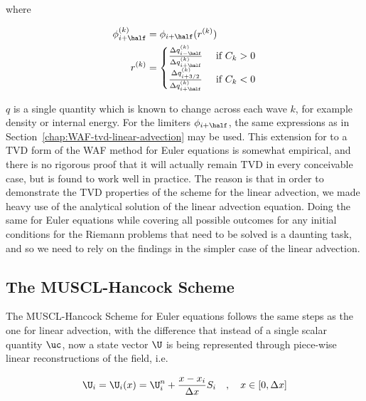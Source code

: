 where

\begin{align}
    \phi_{i+\half} ^{(k)} &= \phi_{i+\half}(r^{(k)}) \\
    r^{(k)} &= \begin{cases}
                \frac{\Delta q_{i-\half}^{(k)}}{\Delta q_{i+\half}^{(k)}} & \text{ if } C_k > 0 \\
                \frac{\Delta q_{i+3/2}^{(k)}}{\Delta q_{i+\half}^{(k)}} & \text{ if } C_k < 0
               \end{cases}
\end{align}

$q$ is a single quantity which is known to change across each wave $k$, for example density or
internal energy. For the limiters $\phi_{i+\half}$, the same expressions as in
Section~\ref{chap:WAF-tvd-linear-advection} may be used.
This extension for to a TVD form of the WAF method for Euler equations is somewhat empirical, and
there is no rigorous proof that it will actually remain TVD in every conceivable case, but is found
to work well in practice. The reason is that in order to demonstrate the TVD properties of the
scheme for the linear advection, we made heavy use of the analytical solution of the linear
advection equation. Doing the same for Euler equations while covering all possible outcomes for any
initial conditions for the Riemann problems that need to be solved is a daunting task, and so we
need to rely on the findings in the simpler case of the linear advection.












\subsection{The MUSCL-Hancock Scheme}

The MUSCL-Hancock Scheme for Euler equations follows the same steps as the one for linear
advection, with the difference that instead of a single scalar quantity $\uc$, now a state vector
$\U$ is being represented through piece-wise linear reconstructions of the field, i.e.

\begin{align}
    \U_i = \U_i(x) = \U_i^n + \frac{x - x_i}{\Delta x} S_i \quad, \quad x \in [0, \Delta x]
\end{align}

